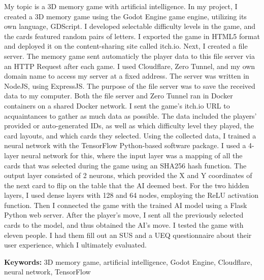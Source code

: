 \vspace{8pt}
My topic is a 3D memory game with artificial intelligence.
In my project, I created a 3D memory game using the Godot Engine game engine, utilizing its own language, GDScript. I developed selectable difficulty levels in the game, and the cards featured random pairs of letters.
I exported the game in HTML5 format and deployed it on the content-sharing site called itch.io.
Next, I created a file server. The memory game sent automaticly the player data to this file server via an HTTP Request after each game. I used Cloudflare, Zero Tunnel, and my own domain name to access my server at a fixed address.
The server was written in NodeJS, using ExpressJS. The purpose of the file server was to save the received data to my computer.
Both the file server and Zero Tunnel ran in Docker containers on a shared Docker network.
I sent the game’s itch.io URL to acquaintances to gather as much data as possible.
The data included the players’ provided or auto-generated IDs, as well as which difficulty level they played, the card layouts, and which cards they selected.
Using the collected data, I trained a neural network with the TensorFlow Python-based software package.
I used a 4-layer neural network for this, where the input layer was a mapping of all the cards that was selected during the game using an SHA256 hash function.
The output layer consisted of 2 neurons, which provided the X and Y coordinates of the next card to flip on the table that the AI deemed best.
For the two hidden layers, I used dense layers with 128 and 64 nodes, employing the ReLU activation function.
Then I connected the game with the trained AI model using a Flask Python web server.
After the player’s move, I sent all the previously selected cards to the model, and thus obtained the AI’s move.
I tested the game with eleven people. I had them fill out an SUS and a UEQ questionnaire about their user experience, which I ultimately evaluated.
\vspace{8pt}


\textbf{Keywords: }3D memory game, artificial intelligence, Godot Engine, Cloudflare, neural network, TensorFlow